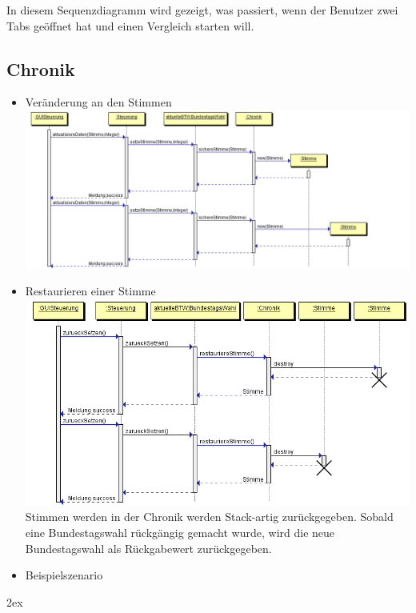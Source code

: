 \documentclass[12pt,a4paper,titlepage]{article}
\begin{document}
In diesem Sequenzdiagramm wird gezeigt, was passiert, wenn der Benutzer zwei Tabs geöffnet hat und einen Vergleich starten will.

\subsection{Chronik}
\begin{itemize}
	\item Veränderung an den Stimmen \\
		\includegraphics[scale=0.5]{Chronik_Sequenzdiagramm-stimmenaendern.png}
	\item Restaurieren einer Stimme \\
		\includegraphics[scale=0.6]{Chronik_Sequenzdiagramm-restaurieren.png}
		\\
		Stimmen werden in der Chronik werden Stack-artig zurückgegeben. Sobald eine Bundestagswahl rückgängig gemacht wurde, wird die neue Bundestagswahl als Rückgabewert zurückgegeben.
	\item Beispielszenario	
\end{itemize}

\begingroup
\parindent 0pt
\parskip 2ex
\def\enotesize{\normalsize}

\endgroup
\end{document}

